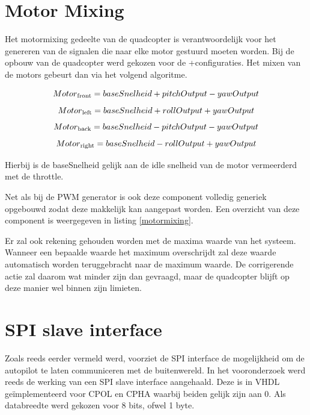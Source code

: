 	\section{Motor Mixing}

		\par Het motormixing gedeelte van de quadcopter is verantwoordelijk voor het genereren van de signalen die naar elke motor gestuurd moeten worden. Bij de opbouw van de quadcopter werd gekozen voor de \textquotesingle +\textquotesingle  configuraties. Het mixen van de motors gebeurt dan via het volgend algoritme.

			\[ Motor\textsubscript{front} = baseSnelheid + pitchOutput - yawOutput \]
			\[ Motor\textsubscript{left} = baseSnelheid + rollOutput + yawOutput \]
			\[ Motor\textsubscript{back} = baseSnelheid - pitchOutput - yawOutput \]
			\[ Motor\textsubscript{right} = baseSnelheid - rollOutput + yawOutput \]

		\par Hierbij is de baseSnelheid gelijk aan de idle snelheid van de motor vermeerderd met de throttle.

		\par Net als bij de PWM generator is ook deze component volledig generiek opgebouwd zodat deze makkelijk kan aangepast worden. Een overzicht van deze component is weergegeven in listing \ref{motormixing}.

			

		\par Er zal ook rekening gehouden worden met de maxima waarde van het systeem. Wanneer een bepaalde waarde het maximum overschrijdt zal deze waarde automatisch worden teruggebracht naar de maximum waarde. De corrigerende actie zal daarom wat minder zijn dan gevraagd, maar de quadcopter blijft op deze manier wel binnen zijn limieten.

	\section{SPI slave interface}

		\par Zoals reeds eerder vermeld werd, voorziet de SPI interface de mogelijkheid om de autopilot te laten communiceren met de buitenwereld. In het vooronderzoek werd reeds de werking van een SPI slave interface aangehaald. Deze is in VHDL ge\"implementeerd voor CPOL en CPHA waarbij beiden gelijk zijn aan 0. Als databreedte werd gekozen voor 8 bits, ofwel 1 byte.

